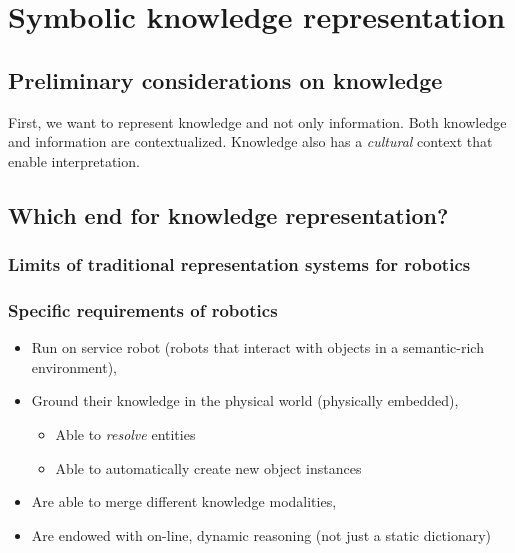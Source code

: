\chapter{Symbolic knowledge representation}


\section{Preliminary considerations on knowledge}
\label{sect|on-knowledge}

First, we want to represent knowledge and not only information.  Both knowledge
and information are contextualized. Knowledge also has a \emph{cultural}
context that enable interpretation. 


\section{Which end for knowledge representation?}
\label{sect|krs-purpose}

\subsection{Limits of traditional representation systems for robotics}
\label{subssect|limits}

\subsection{Specific requirements of robotics}
\label{subssect|robotics-specifics}

\begin{itemize}
	\item Run on service robot (robots that interact with objects in a semantic-rich environment),
	\item Ground their knowledge in the physical world (physically embedded),
	\begin{itemize}
		\item Able to \emph{resolve} entities
		\item Able to automatically create new object instances
	\end{itemize}
	\item Are able to merge different knowledge modalities,
	\item Are endowed with on-line, dynamic reasoning (not just a static dictionary)
\end{itemize}

